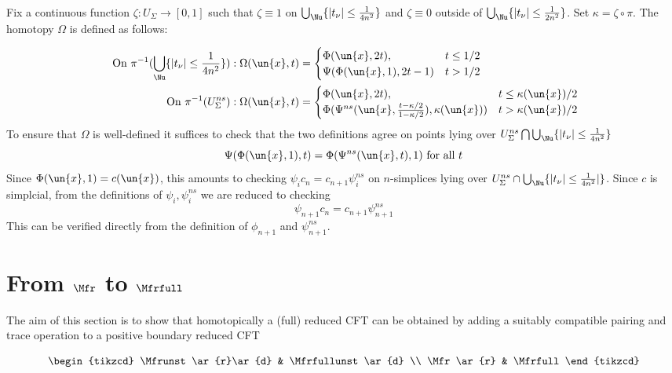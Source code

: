 \documentclass[a4paper,10pt]{amsart}
\begin{document}
Fix a continuous function $\zeta \colon U_{\Sigma} \to [0,1]$ such that $\zeta \equiv 1$ on $\bigcup_{\Nu} \{|t_{\nu}|\leq \frac{1}{4n^2}\}$ and $\zeta \equiv 0$ outside of $\bigcup_{\Nu} \{|t_{\nu}|\leq \frac{1}{2n^2}\}$. Set $\kappa = \zeta \circ \pi$. The homotopy $\Omega$ is defined as follows:

	\begin{align*}
	\mbox{ On } \pi^{-1}(\bigcup_{\Nu} \{|t_{\nu}|\leq \frac{1}{4n^2} \})&: \Omega(\un{x},t) = 
		\begin{cases} 
			\Phi(\un{x},2t), & t \leq 1/2 \\
			\Psi(\Phi(\un{x},1), 2t-1) & t >1/2
		\end{cases}\\
	\mbox{ On } \pi^{-1}(U^{ns}_{\Sigma})&: \Omega(\un{x},t) = 
		\begin{cases} 
			\Phi(\un{x},2t), & t \leq \kappa(\un{x})/2 \\
			\Phi({\Psi^{ns}}(\un{x},\frac{t-\kappa/2}{1-\kappa/2}), \kappa(\un{x})) & t > \kappa({\un{x}})/2
		\end{cases}
	\end{align*}
	To ensure that $\Omega$ is well-defined it suffices to check that the two definitions agree on points lying over $U^{ns}_{\Sigma} \bigcap \bigcup_{\Nu} \{|t_{\nu}|\leq \frac{1}{4n^2} \}$
	\[ \Psi ( \Phi (\un{x},1),t) = \Phi ({\Psi^{ns}} ( \un{x} , t) ,1 ) \mbox{ for all } t\]
Since $\Phi(\un{x},1)=c(\un{x})$, this amounts to checking $\psi_i c_n = c_{n+1} \psi^{ns}_{i}$ on $n$-simplices lying over $U^{ns}_{\Sigma} \cap \bigcup_{\Nu} \{|t_{\nu}|\leq \frac{1}{4n^2}|\}$. Since $c$ is simplcial, from the definitions of $\psi_i,\psi^{ns}_i$ we are reduced to checking 
\[ \psi_{n+1} c_n =  c_{n+1} \psi^{ns}_{n+1}\]
This can be verified directly from the definition of $\phi_{n+1}$ and $\psi^{ns}_{n+1}$.

\section{From $\Mfr$ to $\Mfrfull$}
The aim of this section is to show that homotopically a (full) reduced CFT can be obtained by adding a suitably compatible pairing and trace operation to a positive boundary reduced CFT


\begin{theorem}\label{mainthm2}
\[
	\begin{tikzcd}
		\Mfrunst \ar{r}\ar{d} & \Mfrfullunst \ar{d} \\
		\Mfr \ar{r} & \Mfrfull
	\end{tikzcd}
\]
\end{theorem}
\end{document}
